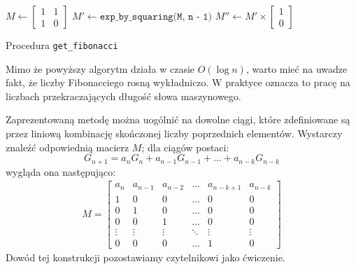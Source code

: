 \begin{algorithm}[h]
  \DontPrintSemicolon



  $M \leftarrow \begin{bmatrix}
                  1 & 1 \\
                  1 & 0
                \end{bmatrix}$\;
  $M' \leftarrow \texttt{exp\_by\_squaring(M, n - 1)}$\;
  $M'' \leftarrow M' \times \begin{bmatrix}1 \\ 0\end{bmatrix}$\;
  \;

  \caption{Procedura \texttt{get\_fibonacci}}
\end{algorithm}
Mimo że powyższy algorytm działa w czasie $O(\log{n})$, warto mieć na uwadze fakt, że liczby Fibonacciego 
rosną wykładniczo. W praktyce oznacza to pracę na liczbach przekraczających długość słowa maszynowego.

Zaprezentowaną metodę można uogólnić na dowolne ciągi, które zdefiniowane są przez liniową 
kombinację skończonej liczby poprzednich elementów. Wystarczy znaleźć odpowiednią macierz $M$; 
dla ciągów postaci:
\begin{equation*}
  G_{n + 1} = a_n G_n + a_{n - 1} G_{n - 1} + ... + a_{n - k} G_{n - k}
\end{equation*}
wygląda ona następująco:
\begin{align*}
  M
  =
  \begin{bmatrix}
    a_n    & a_{n - 1} & a_{n - 2} & \dots  & a_{n - k + 1} & a_{n - k} \\
    1      & 0         & 0         & \dots  & 0             & 0 \\
    0      & 1         & 0         & \dots  & 0             & 0 \\
    0      & 0         & 1         & \dots  & 0             & 0 \\
    \vdots & \vdots    & \vdots    & \ddots & \vdots        & \vdots \\
    0      & 0         & 0         & \dots  & 1             & 0
  \end{bmatrix}
\end{align*}
Dowód tej konstrukcji pozostawiamy czytelnikowi jako ćwiczenie.

